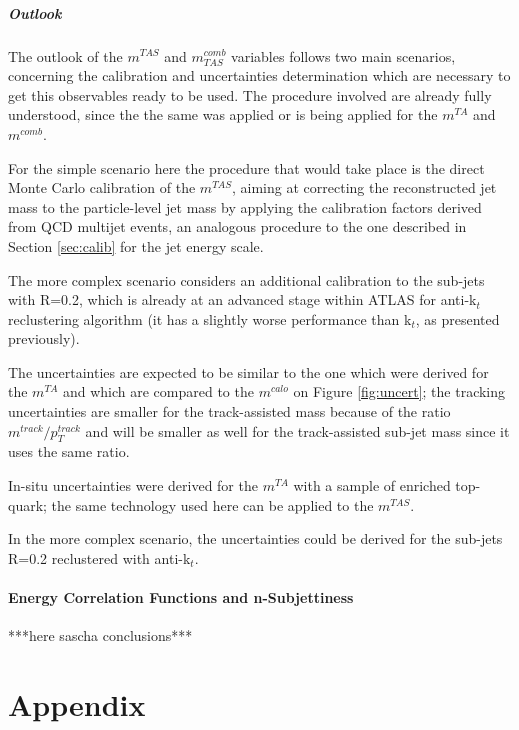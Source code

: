 \documentclass[UKenglish,texlive=2013]{\ATLASLATEXPATH atlasdoc}
\newcommand{\mta}{m^{TA}}
\newcommand{\mtas}{m^{TAS}}
\newcommand{\mcal}{m^{calo}}
\newcommand{\mcomb}{m^{comb}}
\newcommand{\mcombtas}{m^{comb}_{TAS}}
\begin{document}
\subsubsection{Outlook}
The outlook of the $\mtas$ and $\mcombtas$ variables follows two main scenarios, concerning the calibration and uncertainties determination which are necessary to get this observables ready to be used. The procedure involved are already fully understood, since the the same was applied or is being applied for the $\mta$ and $\mcomb$.

For the simple scenario here the procedure that would take place is the direct Monte Carlo calibration of the $\mtas$, aiming at correcting the reconstructed jet mass to the particle-level jet mass by applying the calibration factors derived from QCD multijet events, an analogous procedure to the one described in Section \ref{sec:calib} for the jet energy scale.

The more complex scenario considers an additional calibration to the sub-jets with R=0.2, which is already at an advanced stage within ATLAS for anti-k$_t$ reclustering algorithm (it has a slightly worse performance than k$_t$, as presented previously). 

The uncertainties are expected to be similar to the one which were derived for the $\mta$ and which are compared to the $\mcal$ on Figure \ref{fig:uncert}; the tracking uncertainties are smaller for the track-assisted mass because of the ratio $m^{track}/p_T^{track}$ and will be smaller as well for the track-assisted  sub-jet mass since it uses the same ratio.

In-situ uncertainties were derived for the $\mta$ with a sample of enriched top-quark; the same technology used here can be applied to the $\mtas$.

In the more complex scenario, the uncertainties could be derived for the sub-jets R=0.2 reclustered with anti-k$_{t}$.
\subsection{Energy Correlation Functions and n-Subjettiness}

***here sascha conclusions***

\clearpage
\appendix
\part*{Appendix}
\end{document}
